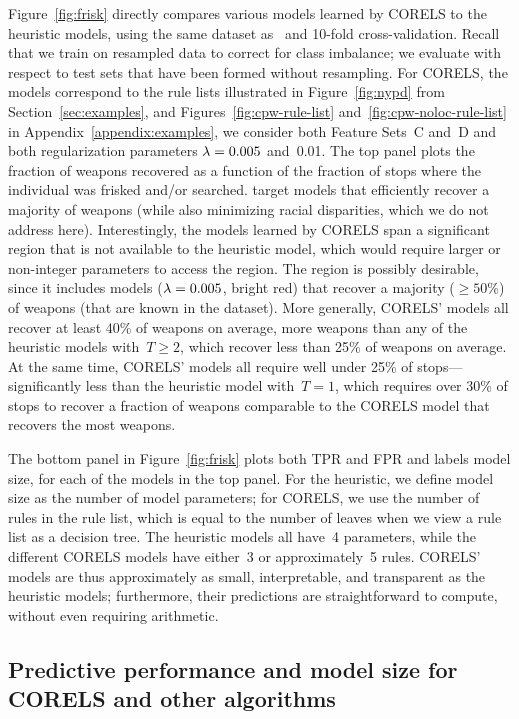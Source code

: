 Figure~\ref{fig:frisk} directly compares various models learned by CORELS to the heuristic models,
using the same dataset as~\citet{Goel16} and 10-fold cross-validation.
%
Recall that we train on resampled data to correct for class imbalance;
we evaluate with respect to test sets that have been formed without resampling.
%
For CORELS, the models correspond to the rule lists illustrated in Figure~\ref{fig:nypd}
from Section~\ref{sec:examples}, and Figures~\ref{fig:cpw-rule-list} and~\ref{fig:cpw-noloc-rule-list}
in Appendix~\ref{appendix:examples}, we consider both Feature Sets~C and~D
and both regularization parameters ${{\lambda} = 0.005}$ and~0.01.
%
The top panel plots the fraction of weapons recovered as a function of the fraction of
stops where the individual was frisked and/or searched.
%
\citet{Goel16} target models that efficiently recover a majority of weapons
(while also minimizing racial disparities, which we do not address here).
%
Interestingly, the models learned by CORELS span a significant region that is not available
to the heuristic model, which would require larger or non-integer parameters to access the region.
%
The region is possibly desirable, since it includes models (${{\lambda} = 0.005}$, bright red)
that recover a majority (${\ge 50\%}$) of weapons (that are known in the dataset).
%
More generally, CORELS' models all recover at least ${40\%}$ of weapons
on average, \ie more weapons than any of the heuristic models with~${T \ge 2}$,
which recover less than 25\% of weapons on average.
%
At the same time, CORELS' models all require well under 25\% of stops---significantly
less than the heuristic model with~${T = 1}$, which requires over 30\% of stops
to recover a fraction of weapons comparable to the CORELS model that recovers the most weapons.

The bottom panel in Figure~\ref{fig:frisk} plots both TPR and FPR and labels model size,
for each of the models in the top panel.
%
For the heuristic, we define model size as the number of model parameters;
for CORELS, we use the number of rules in the rule list,
which is equal to the number of leaves when we view a rule list as a decision tree.
%
The heuristic models all have~4 parameters, while the different CORELS models have
either~3 or approximately~5 rules.
%
CORELS' models are thus approximately as small, interpretable, and transparent
as the heuristic models; furthermore, their predictions are straightforward
to compute, without even requiring arithmetic.

\subsection{Predictive performance and model size for CORELS and other algorithms}
\label{sec:sparsity}

